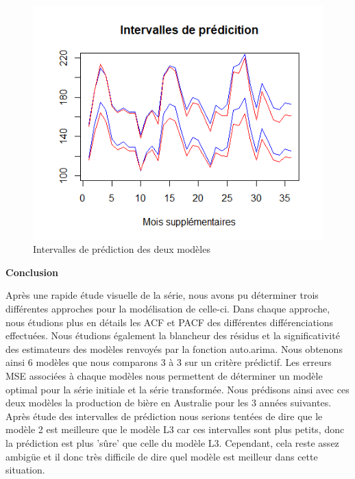 \documentclass[12pt,a4paper]{book}
\newcommand{\1}{\mathds{1}}
\begin{document}
\begin{figure}[h!]
    \centering
    \includegraphics[scale=0.7]{int_pred}  
    \caption{Intervalles de prédiction des deux modèles}
\end{figure}


\vspace{30 mm}

\noindent
{\LARGE \textbf{Conclusion}}

\vspace{5 mm}
Après une rapide étude visuelle de la série, nous avons pu déterminer trois différentes approches pour la modélisation de celle-ci. Dans chaque approche, nous étudions plus en détails les ACF et PACF des différentes différenciations effectuées. Nous étudions également la blancheur des résidus et la significativité des estimateurs des modèles renvoyés par la fonction auto.arima. Nous obtenons ainsi 6 modèles que nous comparons 3 à 3 sur un critère prédictif. Les erreurs MSE associées à chaque modèles nous permettent de déterminer un modèle optimal pour la série initiale et la série transformée. Nous prédisons ainsi avec ces deux modèles la production de bière en Australie pour les 3 années suivantes. 
Après étude des intervalles de prédiction nous serions tentées de dire que le modèle 2 est meilleure que le modèle L3 car ces intervalles sont plus petits, donc la prédiction est plus 'sûre' que celle du modèle L3. Cependant, cela reste assez ambigüe et il donc très difficile de dire quel modèle est meilleur dans cette situation.
\end{document}
